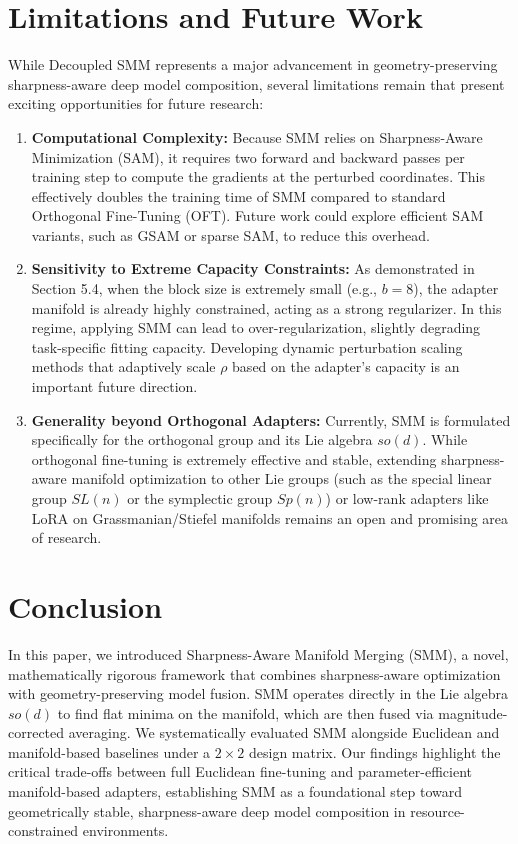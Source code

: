 \documentclass{article}
\theoremstyle{plain}
\theoremstyle{definition}
\theoremstyle{remark}
\begin{document}
\section{Limitations and Future Work}
\label{sec:limitations}
While Decoupled SMM represents a major advancement in geometry-preserving sharpness-aware deep model composition, several limitations remain that present exciting opportunities for future research:
\begin{enumerate}
    \item \textbf{Computational Complexity:} Because SMM relies on Sharpness-Aware Minimization (SAM), it requires two forward and backward passes per training step to compute the gradients at the perturbed coordinates. This effectively doubles the training time of SMM compared to standard Orthogonal Fine-Tuning (OFT). Future work could explore efficient SAM variants, such as GSAM or sparse SAM, to reduce this overhead.
    \item \textbf{Sensitivity to Extreme Capacity Constraints:} As demonstrated in Section 5.4, when the block size is extremely small (e.g., $b=8$), the adapter manifold is already highly constrained, acting as a strong regularizer. In this regime, applying SMM can lead to over-regularization, slightly degrading task-specific fitting capacity. Developing dynamic perturbation scaling methods that adaptively scale $\rho$ based on the adapter's capacity is an important future direction.
    \item \textbf{Generality beyond Orthogonal Adapters:} Currently, SMM is formulated specifically for the orthogonal group and its Lie algebra $so(d)$. While orthogonal fine-tuning is extremely effective and stable, extending sharpness-aware manifold optimization to other Lie groups (such as the special linear group $SL(n)$ or the symplectic group $Sp(n)$) or low-rank adapters like LoRA \cite{hu21lora} on Grassmanian/Stiefel manifolds remains an open and promising area of research.
\end{enumerate}

\section{Conclusion}
\label{sec:conclusion}

In this paper, we introduced Sharpness-Aware Manifold Merging (SMM), a novel, mathematically rigorous framework that combines sharpness-aware optimization with geometry-preserving model fusion. SMM operates directly in the Lie algebra $so(d)$ to find flat minima on the manifold, which are then fused via magnitude-corrected averaging. We systematically evaluated SMM alongside Euclidean and manifold-based baselines under a $2\times2$ design matrix. Our findings highlight the critical trade-offs between full Euclidean fine-tuning and parameter-efficient manifold-based adapters, establishing SMM as a foundational step toward geometrically stable, sharpness-aware deep model composition in resource-constrained environments.

\nocite{*}


\end{document}
